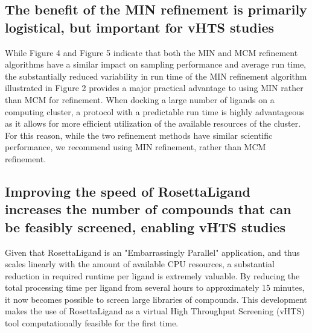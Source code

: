 \subsection{The benefit of the MIN refinement is primarily logistical, but important for vHTS studies}
While Figure 4 and Figure 5 indicate that both the MIN and MCM refinement algorithms have a similar impact on sampling performance and average run time, the substantially reduced variability in run time of the MIN refinement algorithm illustrated in Figure 2 provides a major practical advantage to using MIN rather than MCM for refinement.
When docking a large number of ligands on a computing cluster, a protocol with a predictable run time is highly advantageous as it allows for more efficient utilization of the available resources of the cluster. 
For this reason, while the two refinement methods have similar scientific performance, we recommend using MIN refinement, rather than MCM refinement. 

\subsection{Improving the speed of RosettaLigand increases the number of compounds that can be feasibly screened, enabling vHTS studies}
Given that RosettaLigand is an "Embarrassingly Parallel" application, and thus scales linearly with the amount of available CPU resources, a substantial reduction in required runtime per ligand is extremely valuable.
By reducing the total processing time per ligand from several hours to approximately 15 minutes, it now becomes possible to screen large libraries of compounds.
This development makes the use of RosettaLigand as a virtual High Throughput Screening (vHTS) tool computationally feasible for the first time.

